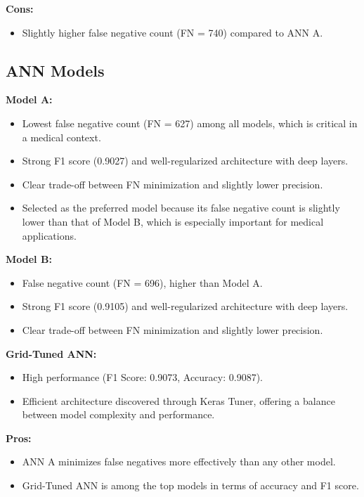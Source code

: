 \documentclass[conference]{IEEEtran}
\begin{document}
\textbf{Cons:}
\begin{itemize}
  \item Slightly higher false negative count (FN = 740) compared to ANN A.
\end{itemize}

\subsection*{ANN Models}

\textbf{Model A:}
\begin{itemize}
  \item Lowest false negative count (FN = 627) among all models, which is critical in a medical context.
  \item Strong F1 score (0.9027) and well-regularized architecture with deep layers.
  \item Clear trade-off between FN minimization and slightly lower precision.
  \item Selected as the preferred model because its false negative count is slightly lower than that of Model B, which is especially important for medical applications.
\end{itemize}

\textbf{Model B:}
\begin{itemize}
  \item False negative count (FN = 696), higher than Model A.
  \item Strong F1 score (0.9105) and well-regularized architecture with deep layers.
  \item Clear trade-off between FN minimization and slightly lower precision.
\end{itemize}

\textbf{Grid-Tuned ANN:}
\begin{itemize}
  \item High performance (F1 Score: 0.9073, Accuracy: 0.9087).
  \item Efficient architecture discovered through Keras Tuner, offering a balance between model complexity and performance.
\end{itemize}

\textbf{Pros:}
\begin{itemize}
  \item ANN A minimizes false negatives more effectively than any other model.
  \item Grid-Tuned ANN is among the top models in terms of accuracy and F1 score.
\end{itemize}
\end{document}
